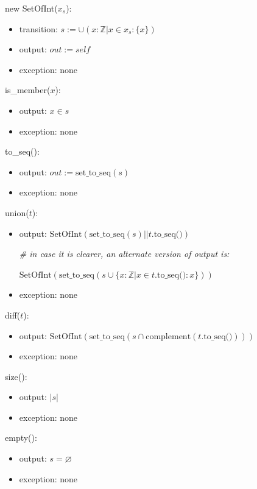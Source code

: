 \documentclass[12pt,fleqn]{examtst}
\begin{document}
\noindent new SetOfInt($x_s$):
\begin{itemize}
\item transition: $s := \cup (x: \mathbb{Z} | x \in x_s : \{ x \} )$
\item output: $\mathit{out} := \mathit{self}$
\item exception: none
\end{itemize}

\noindent is\_member($x$):
\begin{itemize}
\item output: $x \in s$
\item exception: none
\end{itemize}

\noindent to\_seq():
\begin{itemize}
\item output: $out := \mbox{set\_to\_seq}(s)$
\item exception: none
\end{itemize}

\noindent union($t$):
\begin{itemize}
\item output: $\text{SetOfInt} (\mbox{set\_to\_seq}(s) ||
  t.\text{to\_seq()})$

  \textit{\# in case it is clearer, an alternate version of output is:}
  
  $\text{SetOfInt}(\text{set\_to\_seq}(s \cup \{x: \mathbb{Z} | x \in t.\text{to\_seq()} : x \}))$
  
\item exception: none
\end{itemize}

\noindent diff($t$):
\begin{itemize}
\item output:
  $\text{SetOfInt}( \text{set\_to\_seq} (s \cap \text{complement}(t.\text{to\_seq()})))$
  
\item exception: none
\end{itemize}

\noindent size():
\begin{itemize}
\item output: $| s |$
\item exception: none
\end{itemize}

\noindent empty():
\begin{itemize}
\item output: $s = \varnothing$
\item exception: none
\end{itemize}
\end{document}

